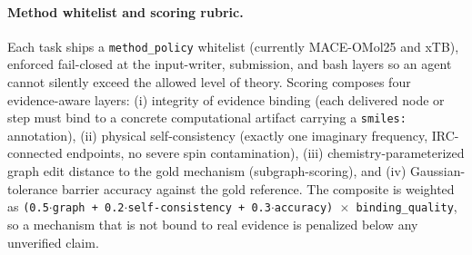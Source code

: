 \documentclass[10pt,twocolumn,letterpaper]{article}
\begin{document}
\paragraph{Method whitelist and scoring rubric.}
Each task ships a \texttt{method\_policy} whitelist (currently MACE-OMol25 and xTB), enforced fail-closed at the input-writer, submission, and bash layers so an agent cannot silently exceed the allowed level of theory. Scoring composes four evidence-aware layers: (i) integrity of evidence binding (each delivered node or step must bind to a concrete computational artifact carrying a \texttt{smiles:} annotation), (ii) physical self-consistency (exactly one imaginary frequency, IRC-connected endpoints, no severe spin contamination), (iii) chemistry-parameterized graph edit distance to the gold mechanism (subgraph-scoring), and (iv) Gaussian-tolerance barrier accuracy against the gold reference. The composite is weighted as \texttt{(0.5$\cdot$graph + 0.2$\cdot$self-consistency + 0.3$\cdot$accuracy) $\times$ binding\_quality}, so a mechanism that is not bound to real evidence is penalized below any unverified claim.
\end{document}

